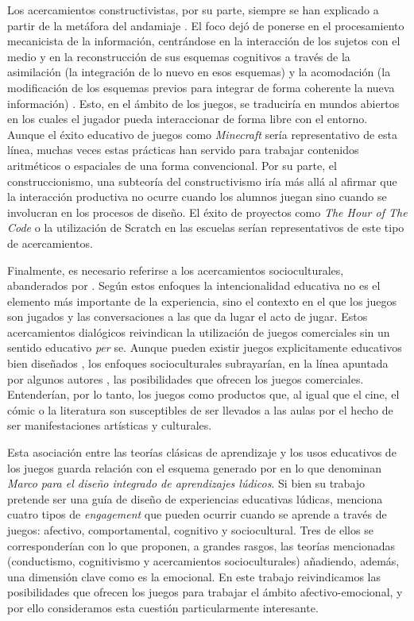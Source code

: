 \documentclass[spanish]{textolivre}
\begin{document}
Los acercamientos constructivistas, por su parte, siempre se han explicado a partir de la metáfora del andamiaje \cite{piaget_psicologinino_1997}. El foco dejó de ponerse en el procesamiento mecanicista de la información, centrándose en la interacción de los sujetos con el medio y en la reconstrucción de sus esquemas cognitivos a través de la asimilación (la integración de lo nuevo en esos esquemas) y la acomodación (la modificación de los esquemas previos para integrar de forma coherente la nueva información) \cite{piaget_psicologinino_1997}. Esto, en el ámbito de los juegos, se traduciría en mundos abiertos en los cuales el jugador pueda interaccionar de forma libre con el entorno. Aunque el éxito educativo de juegos como \emph{Minecraft} \cite{nebel2016mining} sería representativo de esta línea, muchas veces estas prácticas han servido para trabajar contenidos aritméticos o espaciales de una forma convencional. Por su parte, el construccionismo, una subteoría del constructivismo \cite{papert_mindstorms:_1983} iría más allá al afirmar que la interacción productiva no ocurre cuando los alumnos juegan sino cuando se involucran en los procesos de diseño. El éxito de proyectos como \emph{The Hour of The Code} \cite{yauney_systematic_2022} o la utilización de Scratch en las escuelas \cite{fagerlund_computational_2021} serían representativos de este tipo de acercamientos.

Finalmente, es necesario referirse a los acercamientos socioculturales, abanderados por \textcite{gee_what_214}. Según estos enfoques la intencionalidad educativa no es el elemento más importante de la experiencia, sino el contexto en el que los juegos son jugados y las conversaciones a las que da lugar el acto de jugar. Estos acercamientos dialógicos reivindican la utilización de juegos comerciales \cite{lave_situated_1991} sin un sentido educativo \emph{per} se. Aunque pueden existir juegos explicitamente educativos bien diseñados \cite{del2012evaluacion}, los enfoques socioculturales subrayarían, en la línea apuntada por algunos autores \cite{lopez2016experiencias}, las posibilidades que ofrecen los juegos comerciales. Entenderían, por lo tanto, los juegos como productos que, al igual que el cine, el cómic o la literatura son susceptibles de ser llevados a las aulas por el hecho de ser manifestaciones artísticas y culturales.

Esta asociación entre las teorías clásicas de aprendizaje y los usos educativos de los juegos guarda relación con el esquema generado por \textcite{plass_foundations_2015} en lo que denominan \emph{Marco para el diseño integrado de aprendizajes lúdicos}. Si bien su trabajo pretende ser una guía de diseño de experiencias educativas lúdicas, menciona cuatro tipos de \emph{engagement} que pueden ocurrir cuando se aprende a través de juegos: afectivo, comportamental, cognitivo y sociocultural. Tres de ellos se corresponderían con lo que proponen, a grandes rasgos, las teorías mencionadas (conductismo, cognitivismo y acercamientos socioculturales) añadiendo, además, una dimensión clave como es la emocional. En este trabajo reivindicamos las posibilidades que ofrecen los juegos para trabajar el ámbito afectivo-emocional, y por ello consideramos esta cuestión particularmente interesante.
\end{document}
